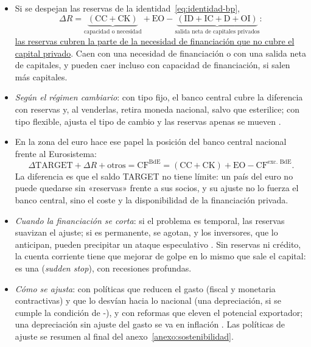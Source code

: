 \documentclass[11pt]{article}
\begin{document}
\begin{itemize}
\item Si se despejan las reservas de la identidad~\eqref{eq:identidad-bp},
\begin{equation}\label{eq:reservas-ajuste}
\Delta R=\underbrace{(\mathrm{CC}+\mathrm{CK})}_{\text{capacidad o necesidad}}+\mathrm{EO}-\underbrace{(\mathrm{ID}+\mathrm{IC}+\mathrm{D}+\mathrm{OI})}_{\text{salida neta de capitales privados}} :
\end{equation}
\uline{las reservas cubren la parte de la necesidad de financiación que no cubre el capital privado}. Caen con una necesidad de financiación o con una salida neta de capitales, y pueden caer incluso con capacidad de financiación, si salen más capitales.
\item \emph{Según el régimen cambiario}: con tipo fijo, el banco central cubre la diferencia con reservas y, al venderlas, retira moneda nacional, salvo que esterilice; con tipo flexible, ajusta el tipo de cambio y las reservas apenas se mueven .
\item En la zona del euro hace ese papel la posición del banco central nacional frente al Eurosistema:
\begin{equation}\label{eq:target-ajuste}
\Delta\text{TARGET}+\Delta R+\text{otros}=\mathrm{CF}^{\text{BdE}}=(\mathrm{CC}+\mathrm{CK})+\mathrm{EO}-\mathrm{CF}^{\text{exc. BdE}} .
\end{equation}
La diferencia es que el saldo TARGET no tiene límite: un país del euro no puede quedarse sin «reservas» frente a sus socios, y su ajuste no lo fuerza el banco central, sino el coste y la disponibilidad de la financiación privada.
\item \emph{Cuando la financiación se corta}: si el problema es temporal, las reservas suavizan el ajuste; si es permanente, se agotan, y los inversores, que lo anticipan, pueden precipitar un ataque especulativo . Sin reservas ni crédito, la cuenta corriente tiene que mejorar de golpe en lo mismo que sale el capital: es una  (\emph{sudden stop}), con recesiones profundas\nocite{Calvo1998SuddenStops}.
\item \emph{Cómo se ajusta}: con políticas que reducen el gasto (fiscal y monetaria contractivas) y que lo desvían hacia lo nacional (una depreciación, si se cumple la condición de -), y con reformas que eleven el potencial exportador; una depreciación sin ajuste del gasto se va en inflación . Las políticas de ajuste se resumen al final del anexo~\ref{anexo:sostenibilidad}.
\end{itemize}
\end{document}
